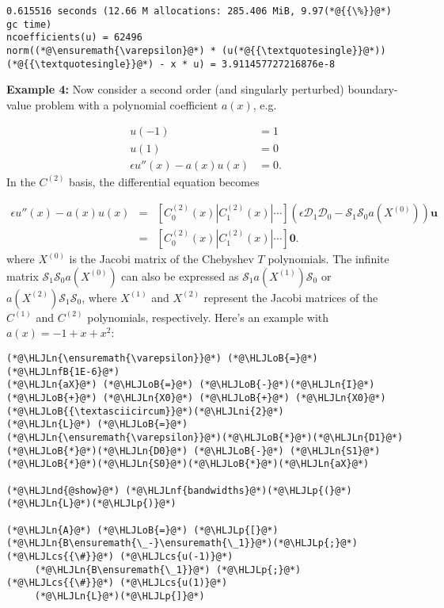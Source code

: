 \documentclass[12pt,landscape]{article}
\newcommand{\HLJLn}[1]{#1}
\newcommand{\HLJLnd}[1]{\textcolor[RGB]{214,102,97}{#1}}
\newcommand{\HLJLnf}[1]{\textcolor[RGB]{66,102,213}{#1}}
\newcommand{\HLJLnfB}[1]{\textcolor[RGB]{59,151,46}{#1}}
\newcommand{\HLJLni}[1]{\textcolor[RGB]{59,151,46}{#1}}
\newcommand{\HLJLoB}[1]{\textcolor[RGB]{102,102,102}{\textbf{#1}}}
\newcommand{\HLJLp}[1]{#1}
\newcommand{\HLJLcs}[1]{\textcolor[RGB]{153,153,119}{\textit{#1}}}
\begin{document}
{\begin{lstlisting}
0.615516 seconds (12.66 M allocations: 285.406 MiB, 9.97(*@{{\%}}@*) gc time)
ncoefficients(u) = 62496
norm((*@\ensuremath{\varepsilon}@*) * (u(*@{{\textquotesingle}}@*))(*@{{\textquotesingle}}@*) - x * u) = 3.911457727216876e-8
\end{lstlisting}


\textbf{Example 4:} Now consider a second order (and singularly perturbed) boundary-value problem with a polynomial coefficient $a(x)$, e.g.


\begin{align*}
u(-1) &= 1\\
u(1) &= 0\\
\epsilon u''(x) - a(x)u(x) &= 0.
\end{align*}
In the $C^{(2)}$ basis, the differential equation becomes


\begin{eqnarray*}
\epsilon u''(x) - a(x)u(x)  &=& \left[ C_0^{(2)}(x) | C_1^{(2)}(x) | \cdots \right]\left(\epsilon\mathcal{D}_1\mathcal{D}_0  - \mathcal{S}_1\mathcal{S}_0a(X^{(0)})  \right) \mathbf{u} \\
 &=& \left[ C_0^{(2)}(x) | C_1^{(2)}(x) | \cdots \right]\mathbf{0}.
 \end{eqnarray*}
where $X^{(0)}$ is the Jacobi matrix of the Chebyshev $T$ polynomials. The infinite matrix $\mathcal{S}_1\mathcal{S}_0a(X^{(0)})$ can also be expressed as $\mathcal{S}_1a(X^{(1)})\mathcal{S}_0$ or $a(X^{(2)})\mathcal{S}_1\mathcal{S}_0$, where $X^{(1)}$ and $X^{(2)}$ represent the Jacobi matrices of the $C^{(1)}$ and $C^{(2)}$ polynomials, respectively.  Here's an example with $a(x) = -1 + x + x^2$:


\begin{lstlisting}
(*@\HLJLn{\ensuremath{\varepsilon}}@*) (*@\HLJLoB{=}@*) (*@\HLJLnfB{1E-6}@*)
(*@\HLJLn{aX}@*) (*@\HLJLoB{=}@*) (*@\HLJLoB{-}@*)(*@\HLJLn{I}@*) (*@\HLJLoB{+}@*) (*@\HLJLn{X0}@*) (*@\HLJLoB{+}@*) (*@\HLJLn{X0}@*)(*@\HLJLoB{{\textasciicircum}}@*)(*@\HLJLni{2}@*)
(*@\HLJLn{L}@*) (*@\HLJLoB{=}@*) (*@\HLJLn{\ensuremath{\varepsilon}}@*)(*@\HLJLoB{*}@*)(*@\HLJLn{D1}@*)(*@\HLJLoB{*}@*)(*@\HLJLn{D0}@*) (*@\HLJLoB{-}@*) (*@\HLJLn{S1}@*)(*@\HLJLoB{*}@*)(*@\HLJLn{S0}@*)(*@\HLJLoB{*}@*)(*@\HLJLn{aX}@*)

(*@\HLJLnd{@show}@*) (*@\HLJLnf{bandwidths}@*)(*@\HLJLp{(}@*)(*@\HLJLn{L}@*)(*@\HLJLp{)}@*)

(*@\HLJLn{A}@*) (*@\HLJLoB{=}@*) (*@\HLJLp{[}@*)(*@\HLJLn{B\ensuremath{\_-}\ensuremath{\_1}}@*)(*@\HLJLp{;}@*)   (*@\HLJLcs{{\#}}@*) (*@\HLJLcs{u(-1)}@*)
     (*@\HLJLn{B\ensuremath{\_1}}@*) (*@\HLJLp{;}@*)   (*@\HLJLcs{{\#}}@*) (*@\HLJLcs{u(1)}@*)
     (*@\HLJLn{L}@*)(*@\HLJLp{]}@*)   


\end{lstlisting}}
\end{document}
